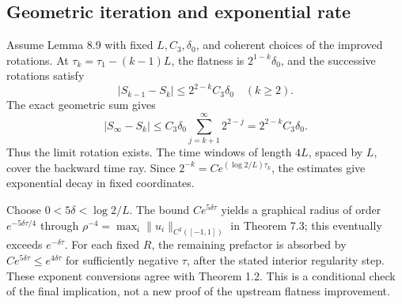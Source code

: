 \documentclass[10pt]{article}
\begin{document}
\subsection*{Geometric iteration and exponential rate}
Assume Lemma 8.9 with fixed \(L,C_3,\delta_0\), and coherent choices of the improved rotations. At \(\tau_k=\tau_1-(k-1)L\), the flatness is \(2^{1-k}\delta_0\), and the successive rotations satisfy \[|S_{k-1}-S_k|\le 2^{2-k}C_3\delta_0\quad(k\ge2).\] The exact geometric sum gives \[|S_\infty-S_k|
 \le C_3\delta_0\sum_{j=k+1}^{\infty}2^{2-j}
 =2^{2-k}C_3\delta_0.\] Thus the limit rotation exists. The time windows of length \(4L\), spaced by \(L\), cover the backward time ray. Since \(2^{-k}=C e^{(\log2/L)\tau_k}\), the estimates give exponential decay in fixed coordinates.\par
Choose \(0<5\delta<\log2/L\). The bound \(Ce^{5\delta\tau}\) yields a graphical radius of order \(e^{-5\delta\tau/4}\) through \(\rho^{-4}=\max_i\|u_i\|_{C^2([-1,1])}\) in Theorem 7.3; this eventually exceeds \(e^{-\delta\tau}\). For each fixed \(R\), the remaining prefactor is absorbed by \(Ce^{5\delta\tau}\le e^{4\delta\tau}\) for sufficiently negative \(\tau\), after the stated interior regularity step. These exponent conversions agree with Theorem 1.2. This is a conditional check of the final implication, not a new proof of the upstream flatness improvement.\par
\end{document}
